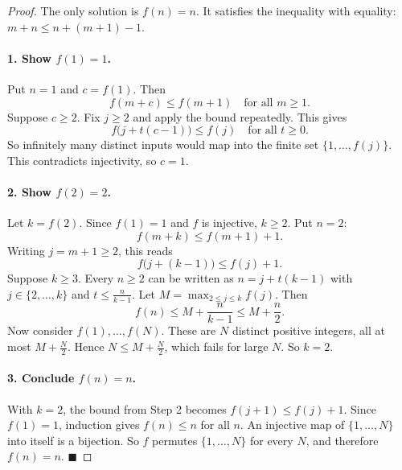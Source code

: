 
\begin{dlsummary}[title={\bfseries Solution 38. The Injective Staircase},breakable]

\begin{proof}
The only solution is \(f(n)=n\). It satisfies the inequality with equality: \(m+n\le n+(m+1)-1\).

\paragraph{1. Show \(f(1)=1\).} Put \(n=1\) and \(c=f(1)\). Then
\[
f(m+c)\le f(m+1)\quad\text{for all } m\ge1.
\]
Suppose \(c\ge2\). Fix \(j\ge2\) and apply the bound repeatedly. This gives
\[
f\bigl(j+t(c-1)\bigr)\le f(j)\quad\text{for all } t\ge0.
\]
So infinitely many distinct inputs would map into the finite set \(\{1,\dots,f(j)\}\). This contradicts injectivity, so \(c=1\).

\paragraph{2. Show \(f(2)=2\).} Let \(k=f(2)\). Since \(f(1)=1\) and \(f\) is injective, \(k\ge2\). Put \(n=2\):
\[
f(m+k)\le f(m+1)+1.
\]
Writing \(j=m+1\ge2\), this reads
\[
f\bigl(j+(k-1)\bigr)\le f(j)+1.
\]
Suppose \(k\ge3\). Every \(n\ge2\) can be written as \(n=j+t(k-1)\) with \(j\in\{2,\dots,k\}\) and \(t\le\frac{n}{k-1}\). Let \(M=\max_{2\le j\le k}f(j)\). Then
\[
f(n)\le M+\frac{n}{k-1}\le M+\frac n2 .
\]
Now consider \(f(1),\dots,f(N)\). These are \(N\) distinct positive integers, all at most \(M+\frac N2\). Hence \(N\le M+\frac N2\), which fails for large \(N\). So \(k=2\).

\paragraph{3. Conclude \(f(n)=n\).} With \(k=2\), the bound from Step 2 becomes \(f(j+1)\le f(j)+1\). Since \(f(1)=1\), induction gives \(f(n)\le n\) for all \(n\). An injective map of \(\{1,\dots,N\}\) into itself is a bijection. So \(f\) permutes \(\{1,\dots,N\}\) for every \(N\), and therefore \(f(n)=n\). \(\blacksquare\)
\end{proof}
\end{dlsummary}

